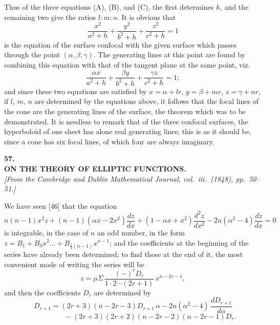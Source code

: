 \documentclass[11pt]{article}
\begin{document}
Thus of the three equations (A), (B), and (C), the first determines $h$, and the remaining
two give the ratios $l : m : n$. It is obvious that
\[
\frac{x^{2}}{a^{2} + h} + \frac{y^{2}}{b^{2} + h} + \frac{z^{2}}{c^{2} + h} = 1
\]
is the equation of the surface confocal with the given surface which passes through
the point $(\alpha, \beta, \gamma)$. The generating lines at this point are found by combining this
equation with that of the tangent plane at the same point, viz.
\[
\frac{\alpha x}{a^{2} + h} + \frac{\beta y}{b^{2} + h} + \frac{\gamma z}{c^{2} + h} = 1;
\]
and since these two equations are satisfied by $x = \alpha + l r$, $y = \beta + m r$, $z = \gamma + n r$, if $l$, $m$, $n$
are determined by the equations above, it follows that the focal lines of the cone are
the generating lines of the surface, the theorem which was to be demonstrated. It is
needless to remark that of the three confocal surfaces, the hyperboloid of one sheet
has alone real generating lines; this is as it should be, since a cone has six focal
lines, of which four are always imaginary.

\bigskip

\begin{center}
\textbf{\large 57.}\\[0.7em]
\textbf{\large ON THE THEORY OF ELLIPTIC FUNCTIONS.}\\[0.5em]
\textit{[From the Cambridge and Dublin Mathematical Journal, vol.~iii.\ (1848), pp.~50--51.]}
\end{center}

\medskip

\noindent We have seen [46] that the equation
\[
n(n - 1) x^{2} z + (n - 1)(\alpha x - 2 x^{2})\frac{d z}{d x} + (1 - \alpha x + x^{2})\frac{d^{2} z}{d x^{2}} - 2 n (\alpha^{2} - 4)\frac{d z}{d x} = 0
\]
is integrable, in the case of $n$ an odd number, in the form $z = B_{1} + B_{3} x^{2} \ldots + B_{\frac{1}{2}(n-1)} x^{n-1}$;
and the coefficients at the beginning of the series have already been determined; to
find those at the end of it, the most convenient mode of writing the series will be
\[
z = \mu \Sigma\, \frac{(-)^{r} D_{r}}{1 \cdot 2 \cdots (2 r + 1)}\, x^{n - 2 r - 1},
\]
and then the coefficients $D_{r}$ are determined by
\[
D_{r+1} = (2 r + 3)(n - 2 r - 3) D_{r+1}\, \alpha - 2 n (\alpha^{2} - 4)\,\frac{d D_{r+1}}{d \alpha}
\]
\[
\phantom{D_{r+1} =}\quad - (2 r + 3)(2 r + 2)(n - 2 r - 2)(n - 2 r - 1) D_{r}.
\]
\end{document}

